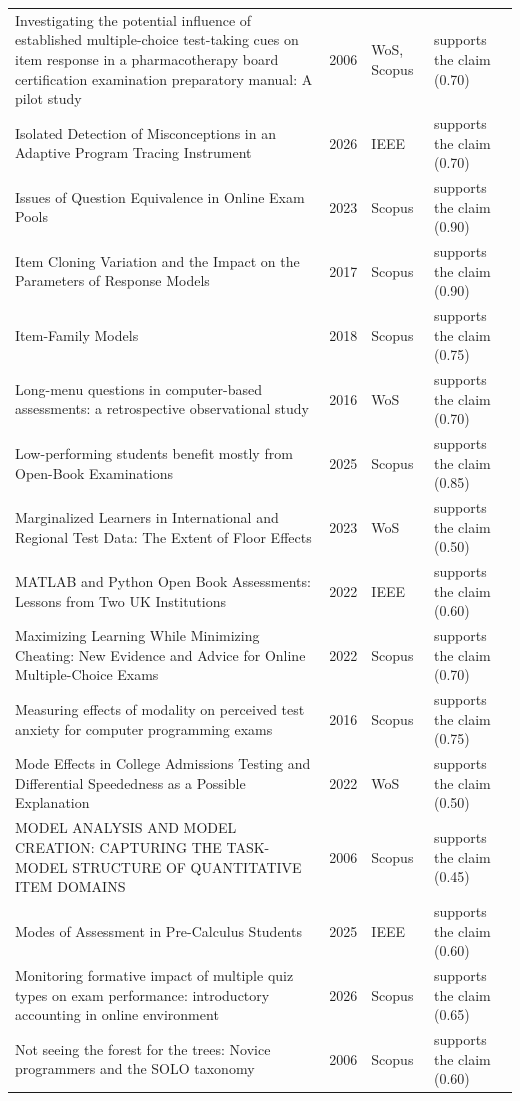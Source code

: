 \begin{longtable}{@{}%
  >{\raggedright\arraybackslash}p{}c%
  >{\raggedright\arraybackslash}p{}%
  >{\raggedright\arraybackslash}p{}@{}}
Investigating the potential influence of established multiple-choice test-taking cues on item response in a pharmacotherapy board certification examination preparatory manual: A pilot study & 2006 & WoS, Scopus & supports the claim (0.70) \\
Isolated Detection of Misconceptions in an Adaptive Program Tracing Instrument & 2026 & IEEE & supports the claim (0.70) \\
Issues of Question Equivalence in Online Exam Pools & 2023 & Scopus & supports the claim (0.90) \\
Item Cloning Variation and the Impact on the Parameters of Response Models & 2017 & Scopus & supports the claim (0.90) \\
Item-Family Models & 2018 & Scopus & supports the claim (0.75) \\
Long-menu questions in computer-based assessments: a retrospective observational study & 2016 & WoS & supports the claim (0.70) \\
Low-performing students benefit mostly from Open-Book Examinations & 2025 & Scopus & supports the claim (0.85) \\
Marginalized Learners in International and Regional Test Data: The Extent of Floor Effects & 2023 & WoS & supports the claim (0.50) \\
MATLAB and Python Open Book Assessments: Lessons from Two UK Institutions & 2022 & IEEE & supports the claim (0.60) \\
Maximizing Learning While Minimizing Cheating: New Evidence and Advice for Online Multiple-Choice Exams & 2022 & Scopus & supports the claim (0.70) \\
Measuring effects of modality on perceived test anxiety for computer programming exams & 2016 & Scopus & supports the claim (0.75) \\
Mode Effects in College Admissions Testing and Differential Speededness as a Possible Explanation & 2022 & WoS & supports the claim (0.50) \\
MODEL ANALYSIS AND MODEL CREATION: CAPTURING THE TASK-MODEL STRUCTURE OF QUANTITATIVE ITEM DOMAINS & 2006 & Scopus & supports the claim (0.45) \\
Modes of Assessment in Pre-Calculus Students & 2025 & IEEE & supports the claim (0.60) \\
Monitoring formative impact of multiple quiz types on exam performance: introductory accounting in online environment & 2026 & Scopus & supports the claim (0.65) \\
Not seeing the forest for the trees: Novice programmers and the SOLO taxonomy & 2006 & Scopus & supports the claim (0.60) \\

\end{longtable}
